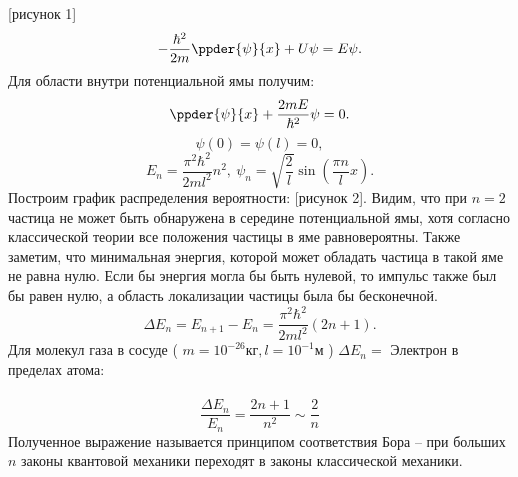 [рисунок 1]
\begin{equation}
    -\frac{\hbar^2}{2m}\ppder{\psi}{x} + U\psi = E\psi.
\end{equation}
Для области внутри потенциальной ямы получим:
\begin{equation}
    \ppder{\psi}{x} + \frac{2mE}{\hbar^2}\psi = 0.
\end{equation}
\[ \psi(0) = \psi(l) = 0, \]
\begin{equation}
    E_n = \frac{\pi^2\hbar^2}{2ml^2}n^2,\ 
    \psi_n = \sqrt{\frac{2}{l}}\sin(\frac{\pi n}{l}x).
\end{equation}
Построим график распределения вероятности: [рисунок 2]. Видим, что при \(n=2\)
частица не может быть обнаружена в середине потенциальной ямы, хотя согласно
классической теории все положения частицы в яме равновероятны. Также заметим,
что минимальная энергия, которой может обладать частица в такой яме не равна
нулю. Если бы энергия могла бы быть нулевой, то импульс также был бы равен нулю,
а область локализации частицы была бы бесконечной.
\[
    \Delta E_n = E_{n+1} - E_n = \frac{\pi^2\hbar^2}{2ml^2}(2n+1).
\]
Для молекул газа в сосуде ( \( m = 10^{-26}\text{кг}, l = 10^{-1}\text{м} \) )
\( \Delta E_n =  \)
Электрон в пределах атома: \\ \\
\[
    \frac{\Delta E_n}{E_n} = \frac{2n+1}{n^2} \sim \frac{2}{n}
\]
Полученное выражение называется принципом соответствия Бора -- при больших
\( n \) законы квантовой механики переходят в законы классической механики.



